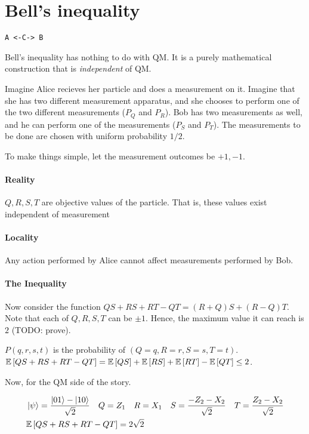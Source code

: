 \section{Bell's inequality}

\begin{verbatim}
A <-C-> B
\end{verbatim}

Bell's inequality has nothing to do with QM. It is a purely mathematical
construction that is \emph{independent} of QM.

Imagine Alice recieves her particle and does a measurement on it. Imagine that
she has two different measurement apparatus, and she chooses to perform one
of the two different measurements ($P_Q$ and $P_R$). Bob has two measurements
as well, and he can perform one of the measurements ($P_S$ and $P_T$).
The measurements to be done are chosen with uniform probability $1/2$.

To make things simple, let the measurement outcomes be $+1, -1$.

\paragraph{Reality}
$Q, R, S, T$ are objective values of the particle. That is, these values exist
independent of measurement

\paragraph{Locality}
Any action performed by Alice cannot affect measurements performed by Bob.

\paragraph{The Inequality}
Now consider the function $QS + RS + RT - QT = (R + Q)S + (R - Q)T$. 
Note that each of $Q, R, S, T$ can be $\pm 1$. Hence, the maximum value
it can reach is $2$ (TODO: prove).

$P(q, r, s, t)$ is the probability of $(Q=q, R=r, S=s, T=t)$.
$\mathbb{E}\left[ QS + RS + RT - QT \right] = \mathbb{E}\left[ QS \right] + \mathbb{E}\left[ RS \right] + \mathbb{E}\left[ RT \right] - \mathbb{E}\left[ QT \right] \leq 2$.


Now, for the QM side of the story. 

\begin{align*}
    &\ket{\psi} = \frac{\ket{01} - \ket{10}}{\sqrt 2} \quad
    Q = Z_1 \quad R = X_1 \quad S = \frac{-Z_2 -X_2}{\sqrt 2} \quad T = \frac{Z_2 - X_2}{\sqrt 2} \\
    & \mathbb{E}\left[ QS + RS + RT - QT \right] = 2 \sqrt 2
\end{align*}

